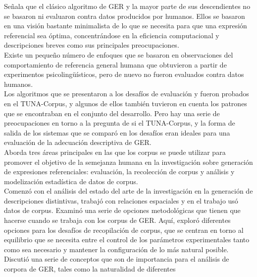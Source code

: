Se\~nala que el cl\'asico algoritmo de GER y la mayor parte de sus descendientes no se basaron ni evaluaron contra datos producidos por humanos. Ellos se basaron en una visi\'on bastante minimalista de lo que se necesita
para que una expresi\'on referencial sea \'optima, concentr\'andose en la eficiencia computacional 
 y descripciones breves como sus principales preocupaciones.\\

 Existe un peque\~no n\'umero de enfoques que 
 se basaron en observaciones del comportamiento de referencia general humana
que obtuvieron a partir de experimentos psicoling\"u\'isticos, pero de nuevo no fueron evaluados
contra datos humanos.\\

Los algoritmos que se presentaron a los desaf\'ios de evaluaci\'on \cite{gatt-balz-kow:2008:ENLG} y \cite{reg2009}
fueron probados en el TUNA-Corpus, y algunos de ellos
tambi\'en tuvieron en cuenta los patrones que se encontraban en el conjunto del desarrollo. Pero hay una serie de preocupaciones en torno a la pregunta de si el TUNA-Corpus, y la forma de salida de los sistemas que se compar\'o 
en los desaf\'ios eran ideales para una evaluaci\'on de la adecuaci\'on descriptiva de GER.\\
Aborda tres \'areas principales en las que los corpus se puede utilizar para
promover el objetivo de la semejanza humana en la investigaci\'on sobre generaci\'on de expresiones referenciales:
evaluaci\'on, la recolecci\'on de corpus y an\'alisis y modelizaci\'on estad\'istica de
datos de corpus.\\
Comenz\'o con el an\'alisis del estado del arte de la investigaci\'on en
la generaci\'on de descripciones distintivas, trabaj\'o con relaciones espaciales y en el trabajo us\'o datos de corpus. Examin\'o una serie de opciones metodol\'ogicas que tienen que hacerse cuando se trabaja con los corpus de GER. Aqu\'i, explor\'o diferentes opciones para los desaf\'ios de recopilaci\'on de corpus, que se centran en torno al equilibrio que se necesita
entre el control de los par\'ametros experimentales tanto como sea necesario
y mantener la configuraci\'on de lo m\'as natural posible. Discuti\'o una serie de conceptos
que son de importancia para el an\'alisis de corpora de GER, tales como la naturalidad de diferentes
